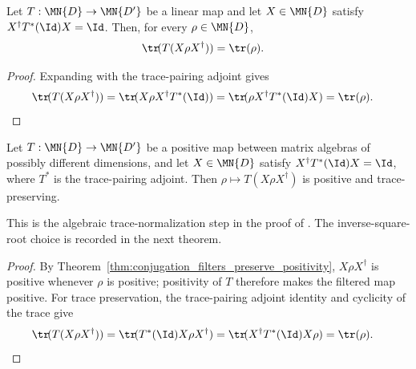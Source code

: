 \begin{lemma}
    \label{lem:trace_normalization_criterion_trace}
    \leanok
    Let $T:\MN{D}\to\MN{D'}$ be a linear map and let $X\in\MN{D}$ satisfy
    $X^\dagger T^*(\Id)X=\Id$. Then, for every $\rho\in\MN{D}$,
    \begin{align}
        \tr\!(T(X\rho X^\dagger))
         & =\tr(\rho).
        \notag
    \end{align}
\end{lemma}

\begin{proof}\leanok
    Expanding with the trace-pairing adjoint gives
    \begin{align}
        \tr\!(T(X\rho X^\dagger))
         & =\tr\!(X\rho X^\dagger T^*(\Id))
        =\tr\!(\rho X^\dagger T^*(\Id)X)
        =\tr(\rho).
        \notag
    \end{align}
\end{proof}

\begin{theorem}
    \label{thm:filtered_trace_normalization_criterion}
    \leanok
    Let $T:\MN{D}\to\MN{D'}$ be a positive map between matrix algebras of
    possibly different dimensions, and let $X\in\MN{D}$ satisfy
    $X^\dagger T^*(\Id)X=\Id$, where $T^*$ is the trace-pairing adjoint.
    Then $\rho\mapsto T(X\rho X^\dagger)$ is positive and trace-preserving.

    This is the algebraic trace-normalization step in the proof of
    \cite[Chapter~3, Lemma ``Making positive maps trace preserving'']
    {Wolf2012Quantum}. The inverse-square-root choice is recorded in the
    next theorem.
\end{theorem}

\begin{proof}\leanok
    By Theorem~\ref{thm:conjugation_filters_preserve_positivity},
    $X\rho X^\dagger$ is positive whenever $\rho$ is positive; positivity
    of $T$ therefore makes the filtered map positive. For trace preservation, the
    trace-pairing adjoint identity and cyclicity of the trace give
    \begin{align}
        \tr\!(T(X\rho X^\dagger))
         & =\tr\!(T^*(\Id)X\rho X^\dagger)
        =\tr\!(X^\dagger T^*(\Id)X\rho)
        =\tr(\rho).
        \notag
    \end{align}
\end{proof}

